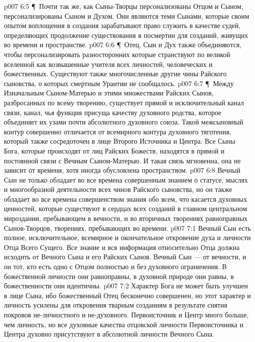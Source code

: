 \vs p007 6:5 \P\ Почти так же, как Сыны\hyp{}Творцы персонализованы Отцом и Сыном,  персонализированы Сыном и Духом. Они являются теми Сынами, которые своим опытом воплощения в создания зарабатывают право служить в качестве судей, определяющих продолжение существования в посмертии для созданий, живущих во времени и пространстве.
\vs p007 6:6 \P\ Отец, Сын и Дух также объединяются, чтобы персонализировать разносторонних  которые странствуют по великой вселенной как возвышенные учителя всех личностей, человеческих и божественных. Существуют также многочисленные другие чины Райского сыновства, о которых смертным Урантии не сообщалось.
\vs p007 6:7 \P\ Между Изначальным Сыном\hyp{}Матерью и этими множествами Райских Сынов, разбросанных по всему творению, существует прямой и исключительный канал связи, канал, чья функция присуща качеству духовного родства, которое объединяет их узами почти абсолютного духовного союза. Такой межсыновный контур совершенно отличается от всемирного контура духовного тяготения, который также сосредоточен в лице Второго Источника и Центра. Все Сыны Бога, которые происходят от лиц Райских Божеств, находятся в прямой и постоянной связи с Вечным Сыном\hyp{}Матерью. И такая связь мгновенна, она не зависит от времени, хотя иногда обусловлена пространством.
\vs p007 6:8 Вечный Сын не только обладает во все времена совершенным знанием о статусе, мыслях и многообразной деятельности всех чинов Райского сыновства, но он также обладает во все времена совершенством знания обо всем, что касается духовных ценностей, которые существуют в сердцах всех созданий в главном центральном мироздании, пребывающем в вечности, и во вторичных творениях равноправных Сынов\hyp{}Творцов, творениях, пребывающих во времени.
\vs p007 7:1 Вечный Сын есть полное, исключительное, всемирное и окончательное откровение духа и личности Отца Всего Сущего. Все знание и вся информация относительно Отца должна исходить от Вечного Сына и его Райских Сынов. Вечный Сын --- от вечности, и он тот, кто есть одно с Отцом полностью и без духовного ограничения. В божественной личности они равноправны, в духовной природе они равны, в божественности они идентичны.
\vs p007 7:2 Характер Бога не может быть улучшен в лице Сына, ибо божественный Отец бесконечно совершенен, но этот характер и личность усилены для откровения тварным созданиям в результате снятия покровов не\hyp{}личностного и не\hyp{}духовного. Первоисточник и Центр много больше, чем личность, но все духовные качества отцовской личности Первоисточника и Центра духовно присутствуют в абсолютной личности Вечного Сына.
